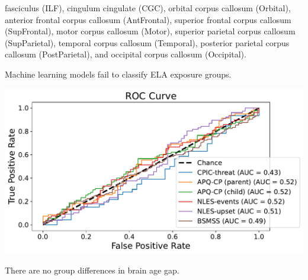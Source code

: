 \documentclass[a0paper,landscape,fontscale=0.385]{baposter}
\newenvironment{Figure}
  {\par\medskip\noindent\minipage{\linewidth}}
  {\endminipage\par\medskip}
\begin{document}
\begin{poster}
{\begin{minipage}[b]{0.5\textwidth}
\begin{Figure}
{            fasciculus (ILF), cingulum cingulate (CGC), orbital corpus callosum
            (Orbital), anterior frontal corpus callosum (AntFrontal), superior
            frontal corpus callosum (SupFrontal), motor corpus callosum (Motor),
            superior parietal corpus callosum (SupParietal), temporal corpus
            callosum (Temporal), posterior parietal corpus callosum (PostParietal),
            and occipital corpus callosum (Occipital).
        }
    \end{Figure}
\end{minipage}
\hfill
\begin{minipage}[b]{0.475\textwidth}
    \begin{center}
        Machine learning models fail to classify ELA exposure groups.
    \end{center}

    \vspace{-1em}

    \begin{Figure}
        \centering
        \includegraphics[width=\textwidth]{roc_curve_pcr_lasso.pdf}
    \end{Figure}

    \begin{center}
        There are no group differences in brain age gap.
    \end{center}


\end{minipage}}
\end{poster}
\end{document}
